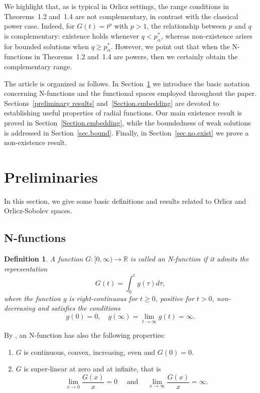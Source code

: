\documentclass[leqno,twoside, 12pt]{amsart}
\theoremstyle{plain}
\numberwithin{equation}{section} \numberwithin{figure}{section}
\newtheorem{definition}[theorem]{Definition}
\theoremstyle{definition}
\numberwithin{equation}{section}
\begin{document}
We highlight that, as is typical in Orlicz settings, the range conditions in Theorems~1.2 and~1.4 are not complementary, in contrast with the classical power case. Indeed, for $G(t)=t^p$ with $p>1$, the relationship between $p$ and $q$ is complementary: existence holds whenever $q < p_\alpha^*$, whereas non-existence arises for bounded solutions when $q \geq p_\alpha^*$.  However, we  point out that when the N-functions in Theorems~1.2 and~1.4 are powers, then we certainly obtain the complementary range.  

\bigskip
The article is organized as follows. In Section~\ref{preliminaries} we introduce the basic notation concerning N-functions and the functional spaces employed throughout the paper. Sections~\ref{preliminary results} and~\ref{Section.embedding} are devoted to establishing useful properties of radial functions. Our main existence result is proved in Section~\ref{Section.embedding}, while the boundedness of weak solutions is addressed in Section~\ref{sec.bound}. Finally, in Section~\ref{sec.no.exist} we prove a non-existence result.
 
  

\section{Preliminaries}\label{preliminaries}

In this section, we give some basic definitions and results related to Orlicz and Orlicz-Sobolev  spaces. 

\subsection{N-functions} \label{sec.prelim}
\begin{definition}\label{d2.1}
A function $G \colon [0, \infty) \rightarrow \mathbb{R}$ is called an N-function if it admits the representation
$$G(t)= \int _{0} ^{t} g(\tau) d\tau,$$
where the function $g$ is right-continuous for $t \geq 0$,  positive for $t >0$, non-decreasing and satisfies the conditions
$$g(0)=0, \quad g(\infty)=\lim_{t \to \infty}g(t)=\infty.$$
\end{definition}
\noindent By \cite[Chapter 1]{KR}, an N-function has also the following properties:
\begin{enumerate}
\item[(i)] $G$ is continuous, convex, increasing, even and $G(0) = 0$.
\item[(ii)] $G$ is super-linear at zero and at infinite, that is $$\lim_{x\rightarrow 0} \dfrac{G(x)}{x}=0 \quad \text{ and } \quad \lim_{x\rightarrow \infty} \dfrac{G(x)}{x}=\infty.$$
\end{enumerate}
\end{document}

